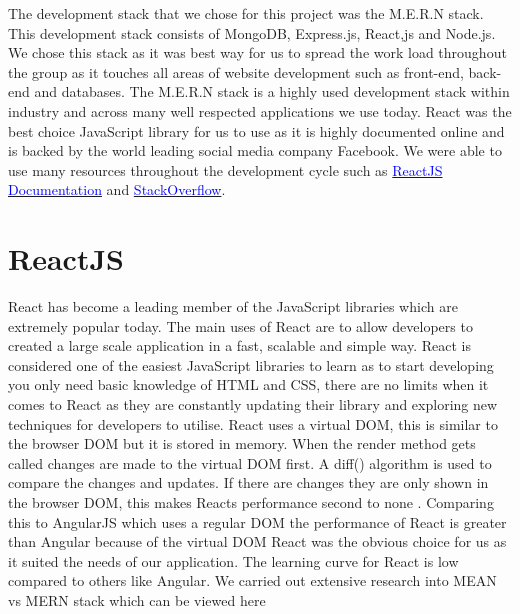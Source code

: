 The development stack that we chose for this project was the M.E.R.N stack. This development stack consists of MongoDB, Express.js, React,js and Node.js. We chose this stack as it was best way for us to spread the work load throughout the group as it touches all areas of website development such as front-end, back-end and databases. The M.E.R.N stack is a highly used development stack within industry and across many well respected applications we use today. React was the best choice JavaScript library for us to use as it is highly documented online and is backed by the world leading social media company Facebook. We were able to use many resources throughout the development cycle such as \href{https://reactjs.org/}{\textcolor{blue}{ReactJS Documentation}} and \href{https://stackoverflow.com/}{\textcolor{blue}{StackOverflow}}.
\newline

\section{ReactJS}
React has become a leading member of the JavaScript libraries which are extremely popular today. The main uses of React are to allow developers to created a large scale application in a fast, scalable and simple way. React is considered one of the easiest JavaScript libraries to learn as to start developing you only need basic knowledge of HTML and CSS, there are no limits when it comes to React as they are constantly updating their library and exploring new techniques for developers to utilise. 
React uses a virtual DOM, this is similar to the browser DOM but it is stored in memory. When the render method gets called changes are made to the virtual DOM first. A diff() algorithm is used to compare the changes and updates. If there are changes they are only shown in the browser DOM, this makes Reacts performance second to none \cite{aggarwal2018modern}. Comparing this to AngularJS which uses a regular DOM the performance of React is greater than Angular because of the virtual DOM \cite{kumar2016comparative}
React was the obvious choice for us as it suited the needs of our application. The learning curve for React is low compared to others like Angular. We carried out extensive research into MEAN vs MERN stack which can be viewed here \pageref{Section:Stack Comparison: MEAN vs MERN} 
\newline

